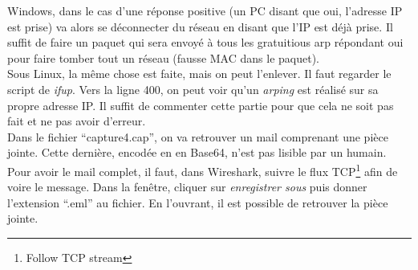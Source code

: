Windows, dans le cas d'une réponse positive (un PC disant que oui, l'adresse IP est prise) va alors se déconnecter du réseau en disant que l'IP est déjà prise. Il suffit de faire un paquet qui sera envoyé à tous les gratuitious arp répondant oui pour faire tomber tout un réseau (fausse MAC dans le paquet).\\
Sous Linux, la même chose est faite, mais on peut l'enlever. Il faut regarder le script de \textit{ifup}. Vers la ligne 400, on peut voir qu'un \textit{arping} est réalisé sur sa propre adresse IP. Il suffit de commenter cette partie pour que cela ne soit pas fait et ne pas avoir d'erreur.\\
Dans le fichier \enquote{capture4.cap}, on va retrouver un mail comprenant une pièce jointe. Cette dernière, encodée en en Base64, n'est pas lisible par un humain. Pour avoir le mail complet, il faut, dans Wireshark, suivre le flux TCP\footnote{Follow TCP stream} afin de voire le message. Dans la fenêtre, cliquer sur \textit{enregistrer sous} puis donner l'extension \enquote{.eml} au fichier. En l'ouvrant, il est possible de retrouver la pièce jointe.